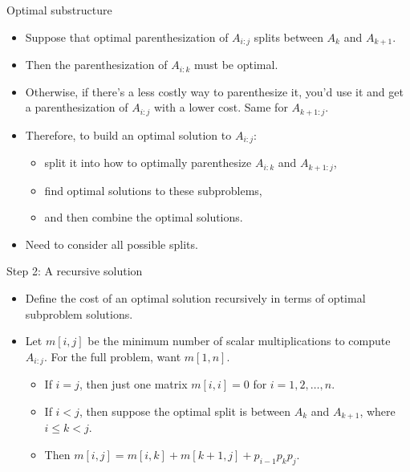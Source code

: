 \documentclass[aspectratio=169]{beamer}
\begin{document}
\begin{frame}{Optimal substructure}
    \begin{itemize}
        \item Suppose that optimal parenthesization of $A_{i:j}$ splits between $A_k$ and $A_{k+1}$.
        \item Then the parenthesization of $A_{i:k}$ must be optimal.
        \item Otherwise, if there's a less costly way to parenthesize it, you'd use it and get a parenthesization of $A_{i:j}$ with a lower cost. Same for $A_{k+1:j}$.
        \item Therefore, to build an optimal solution to $A_{i:j}$:
            \begin{itemize}
                \item split it into how to optimally parenthesize $A_{i:k}$ and $A_{k+1:j}$,
                \item find optimal solutions to these subproblems,
                \item and then combine the optimal solutions.
            \end{itemize}
        \item Need to consider all possible splits.
    \end{itemize}
\end{frame}

\begin{frame}{Step 2: A recursive solution}
    \begin{itemize}
        \item Define the cost of an optimal solution recursively in terms of optimal subproblem solutions.
        \item Let $m[i, j]$ be the minimum number of scalar multiplications to compute $A_{i:j}$. For the full problem, want $m[1, n]$.
        \begin{itemize}
            \item If $i = j$, then just one matrix $ m[i, i] = 0$ for $i = 1, 2, \ldots, n$.
            \item If $i < j$, then suppose the optimal split is between $A_k$ and $A_{k+1}$, where $i \leq k < j$.
            \item Then $m[i, j] = m[i, k] + m[k+1, j] + p_{i-1} p_k p_j$.
        \end{itemize}
    \end{itemize}
\end{frame}
\end{document}
